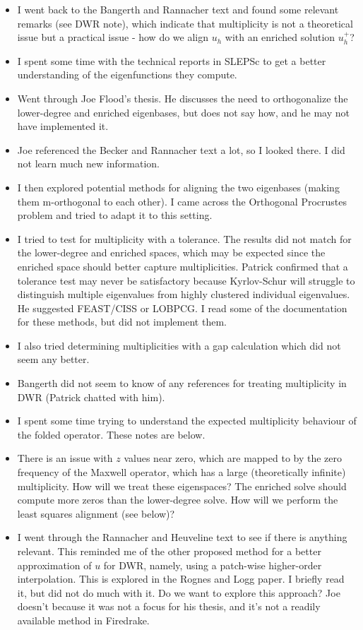 \documentclass[12pt,a4paper]{article}
\begin{document}
\begin{itemize}
    \item I went back to the Bangerth and Rannacher text and found some relevant remarks (see DWR note), which indicate that multiplicity is not a theoretical issue but a practical issue - how do we align $u_h$ with an enriched solution $u_h^+$?
    \item I spent some time with the technical reports in SLEPSc to get a better understanding of the eigenfunctions they compute. 
    \item Went through Joe Flood's thesis. He discusses the need to orthogonalize the lower-degree and enriched eigenbases, but does not say how, and he may not have implemented it. 
    \item Joe referenced the Becker and Rannacher text a lot, so I looked there. I did not learn much new information.
    \item I then explored potential methods for aligning the two eigenbases (making them m-orthogonal to each other). I came across the Orthogonal Procrustes problem and tried to adapt it to this setting.
    \item I tried to test for multiplicity with a tolerance. The results did not match for the lower-degree and enriched spaces, which may be expected since the enriched space should better capture multiplicities. Patrick confirmed that a tolerance test may never be satisfactory because Kyrlov-Schur will struggle to distinguish multiple eigenvalues from highly clustered individual eigenvalues. He suggested FEAST/CISS or LOBPCG. I read some of the documentation for these methods, but did not implement them.
    \item I also tried determining multiplicities with a gap calculation which did not seem any better. 
    \item Bangerth did not seem to know of any references for treating multiplicity in DWR (Patrick chatted with him).
    \item I spent some time trying to understand the expected multiplicity behaviour of the folded operator. These notes are below.
    \item There is an issue with $z$ values near zero, which are mapped to by the zero frequency of the Maxwell operator, which has a large (theoretically infinite) multiplicity. How will we treat these eigenspaces? The enriched solve should compute more zeros than the lower-degree solve. How will we perform the least squares alignment (see below)? 
    \item I went through the Rannacher and Heuveline text to see if there is anything relevant. This reminded me of the other proposed method for a better approximation of $u$ for DWR, namely, using a patch-wise higher-order interpolation. This is explored in the Rognes and Logg paper. I briefly read it, but did not do much with it. Do we want to explore this approach? Joe doesn't because it was not a focus for his thesis, and it's not a readily available method in Firedrake.

\end{itemize}
\end{document}
